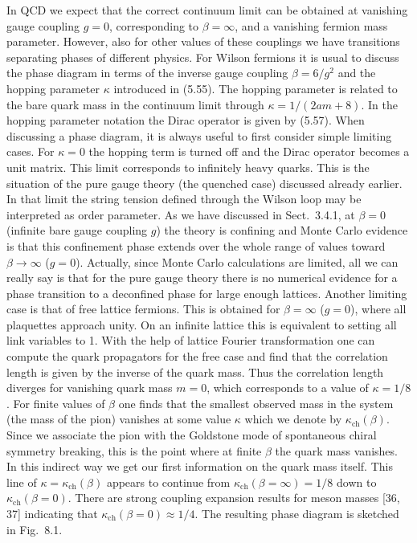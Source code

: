 In QCD we expect that the correct continuum limit can be obtained at vanishing
gauge coupling $g = 0$, corresponding to $\beta = \infty$, and a vanishing
fermion mass parameter. However, also for other values of these couplings we
have transitions separating phases of different physics.
For Wilson fermions it is usual to discuss the phase diagram in terms of the
inverse gauge coupling $\beta = 6/g^2$ and the hopping parameter $\kappa$
introduced in (5.55). The hopping parameter is related to the bare quark mass
in the continuum limit through $\kappa = 1/(2am + 8)$. In the hopping parameter
notation the Dirac operator is given by (5.57).
When discussing a phase diagram, it is always useful to first consider simple
limiting cases. For $\kappa = 0$ the hopping term is turned off and the Dirac
operator becomes a unit matrix. This limit corresponds to infinitely heavy
quarks. This is the situation of the pure gauge theory (the quenched case)
discussed already earlier. In that limit the string tension defined through the
Wilson loop may be interpreted as order parameter. As we have discussed in
Sect.~3.4.1, at $\beta = 0$ (infinite bare gauge coupling $g$) the theory is
confining and Monte Carlo evidence is that this confinement phase extends over
the whole range of values toward $\beta \to \infty$ ($g = 0$). Actually, since
Monte Carlo calculations are limited, all we can really say is that for the
pure gauge theory there is no numerical evidence for a phase transition to a
deconfined phase for large enough lattices.
Another limiting case is that of free lattice fermions. This is obtained for
$\beta = \infty$ ($g = 0$), where all plaquettes approach unity. On an infinite
lattice this is equivalent to setting all link variables to 1. With the help of
lattice Fourier transformation one can compute the quark propagators for the
free case and find that the correlation length is given by the inverse of the
quark mass. Thus the correlation length diverges for vanishing quark mass
$m = 0$, which corresponds to a value of $\kappa = 1/8$.
For finite values of $\beta$ one finds that the smallest observed mass in the
system (the mass of the pion) vanishes at some value $\kappa$ which we denote
by $\kappa_{\mathrm{ch}}(\beta)$. Since we associate the pion with the
Goldstone mode of spontaneous chiral symmetry breaking, this is the point where
at finite $\beta$ the quark mass vanishes. In this indirect way we get our
first information on the quark mass itself. This line of
$\kappa = \kappa_{\mathrm{ch}}(\beta)$ appears to continue from
$\kappa_{\mathrm{ch}}(\beta = \infty) = 1/8$ down to
$\kappa_{\mathrm{ch}}(\beta = 0)$. There are strong coupling expansion results
for meson masses [36, 37] indicating that
$\kappa_{\mathrm{ch}}(\beta = 0) \approx 1/4$. The resulting phase diagram is
sketched in Fig.~8.1.

